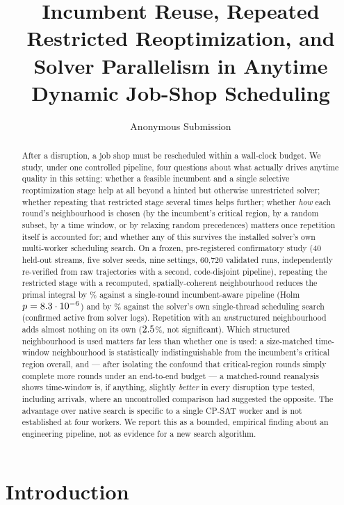 \documentclass[letterpaper]{article} %
\title{Incumbent Reuse, Repeated Restricted Reoptimization, and Solver Parallelism in Anytime Dynamic Job-Shop Scheduling}
\author{
    Anonymous Submission
}
\begin{document}
\maketitle

\begin{abstract}
After a disruption, a job shop must be rescheduled within a wall-clock budget. We study, under one controlled pipeline, four questions about what actually drives anytime quality in this setting: whether a feasible incumbent and a single selective reoptimization stage help at all beyond a hinted but otherwise unrestricted solver; whether repeating that restricted stage several times helps further; whether \emph{how} each round's neighbourhood is chosen (by the incumbent's critical region, by a random subset, by a time window, or by relaxing random precedences) matters once repetition itself is accounted for; and whether any of this survives the installed solver's own multi-worker scheduling search. On a frozen, pre-registered confirmatory study (40 held-out streams, five solver seeds, nine settings, 60{,}720 validated runs, independently re-verified from raw trajectories with a second, code-disjoint pipeline), repeating the restricted stage with a recomputed, spatially-coherent neighbourhood reduces the primal integral by \UOneBTwocritVsBZeroiaipRel\% against a single-round incumbent-aware pipeline (Holm $p=8.3\cdot10^{-6}$) and by \UOneBTwocritVsBFivenativeOnewRel\% against the solver's own single-thread scheduling search (confirmed active from solver logs). Repetition with an \emph{un}structured neighbourhood adds almost nothing on its own ($2.5$\%, not significant). Which structured neighbourhood is used matters far less than whether one is used: a size-matched time-window neighbourhood is statistically indistinguishable from the incumbent's critical region overall, and --- after isolating the confound that critical-region rounds simply complete more rounds under an end-to-end budget --- a matched-round reanalysis shows time-window is, if anything, slightly \emph{better} in every disruption type tested, including arrivals, where an uncontrolled comparison had suggested the opposite. The advantage over native search is specific to a single CP-SAT worker and is not established at four workers. We report this as a bounded, empirical finding about an engineering pipeline, not as evidence for a new search algorithm.
\end{abstract}

\section{Introduction}
\end{document}
